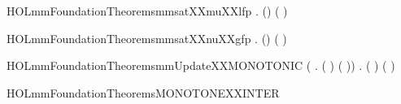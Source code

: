 \begin{SaveVerbatim}{HOLmmFoundationTheoremsmmsatXXmuXXlfp}
\HOLTokenTurnstile{} \HOLSymConst{\HOLTokenForall{}}    .
     (\HOLSymConst{,}\HOLSymConst{,})     \HOLSymConst{\HOLTokenEquiv{}}  \HOLConst{\HOLTokenIn{}}  (    )
\end{SaveVerbatim}
\newcommand{\HOLmmFoundationTheoremsmmsatXXmuXXlfp}{\UseVerbatim{HOLmmFoundationTheoremsmmsatXXmuXXlfp}}
\begin{SaveVerbatim}{HOLmmFoundationTheoremsmmsatXXnuXXgfp}
\HOLTokenTurnstile{} \HOLSymConst{\HOLTokenForall{}}    .
     (\HOLSymConst{,}\HOLSymConst{,})     \HOLSymConst{\HOLTokenEquiv{}}  \HOLConst{\HOLTokenIn{}}  (    )
\end{SaveVerbatim}
\newcommand{\HOLmmFoundationTheoremsmmsatXXnuXXgfp}{\UseVerbatim{HOLmmFoundationTheoremsmmsatXXnuXXgfp}}
\begin{SaveVerbatim}{HOLmmFoundationTheoremsmmUpdateXXMONOTONIC}
\HOLTokenTurnstile{} (\HOLSymConst{\HOLTokenForall{}}   .
       \HOLConst{\HOLTokenSubset{}}  \HOLSymConst{\HOLTokenImp{}}  (   ) (   )) \HOLSymConst{\HOLTokenConj{}}
   \HOLSymConst{\HOLTokenForall{}}   .
        \HOLSymConst{\HOLTokenImp{}}  (   ) (   )
\end{SaveVerbatim}
\newcommand{\HOLmmFoundationTheoremsmmUpdateXXMONOTONIC}{\UseVerbatim{HOLmmFoundationTheoremsmmUpdateXXMONOTONIC}}
\begin{SaveVerbatim}{HOLmmFoundationTheoremsMONOTONEXXINTER}
\HOLTokenTurnstile{}  \HOLConst{\HOLTokenSubset{}}  \HOLSymConst{\HOLTokenImp{}}  \HOLConst{\HOLTokenSubset{}}  \HOLSymConst{\HOLTokenImp{}}  \HOLConst{\HOLTokenInter{}}  \HOLConst{\HOLTokenSubset{}}  \HOLConst{\HOLTokenInter{}} 
\end{SaveVerbatim}
